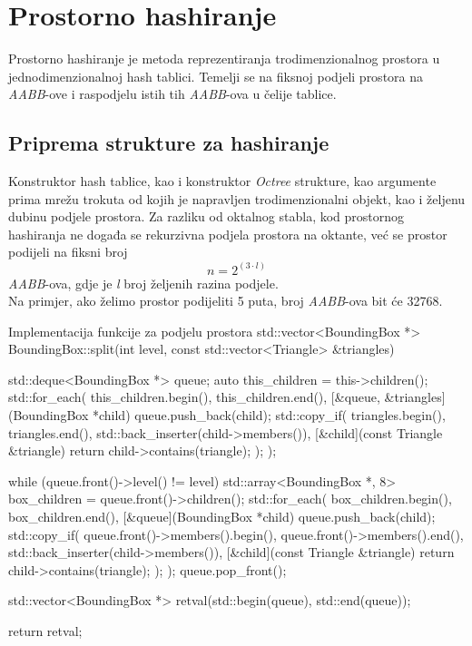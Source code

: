 \chapter{Prostorno hashiranje}
\label{chapter:spatial}

Prostorno hashiranje je metoda reprezentiranja trodimenzionalnog prostora u
jednodimenzionalnoj hash tablici. Temelji se na fiksnoj podjeli prostora na
\textit{AABB}-ove i raspodjelu istih tih \textit{AABB}-ova u čelije tablice. ~\cite{gamedev}

\section{Priprema strukture za hashiranje}

Konstruktor hash tablice, kao i konstruktor \textit{Octree} strukture, kao argumente
prima mrežu trokuta od kojih je napravljen trodimenzionalni objekt, kao i željenu
dubinu podjele prostora. Za razliku od oktalnog stabla, kod prostornog hashiranja
ne događa se rekurzivna podjela prostora na oktante, već se prostor podijeli na
fiksni broj \[n = 2^{(3\cdot l)}\] \textit{AABB}-ova, gdje je \textit{l} broj
željenih razina podjele. \\ Na primjer, ako želimo prostor podijeliti 5 puta,
broj \textit{AABB}-ova bit će 32768.

\begin{cppSource}{Implementacija funkcije za podjelu prostora}
std::vector<BoundingBox *>
BoundingBox::split(int level, const std::vector<Triangle> &triangles) {
    std::deque<BoundingBox *> queue;
    auto this_children = this->children();
    std::for_each(
        this_children.begin(),
        this_children.end(),
        [&queue, &triangles](BoundingBox *child) {
            queue.push_back(child);
            std::copy_if(
                triangles.begin(),
                triangles.end(),
                std::back_inserter(child->members()),
                [&child](const Triangle &triangle) {
                    return child->contains(triangle);
                }
            );
        }
    );

    while (queue.front()->level() != level) {
        std::array<BoundingBox *, 8> box_children = queue.front()->children();
        std::for_each(
            box_children.begin(),
            box_children.end(),
            [&queue](BoundingBox *child) {
                queue.push_back(child);
                std::copy_if(
                    queue.front()->members().begin(),
                    queue.front()->members().end(),
                    std::back_inserter(child->members()),
                    [&child](const Triangle &triangle) {
                        return child->contains(triangle);
                    }
                );
            }
        );
        queue.pop_front();
    }

    std::vector<BoundingBox *> retval(std::begin(queue), std::end(queue));

    return retval;
}
\end{cppSource}

